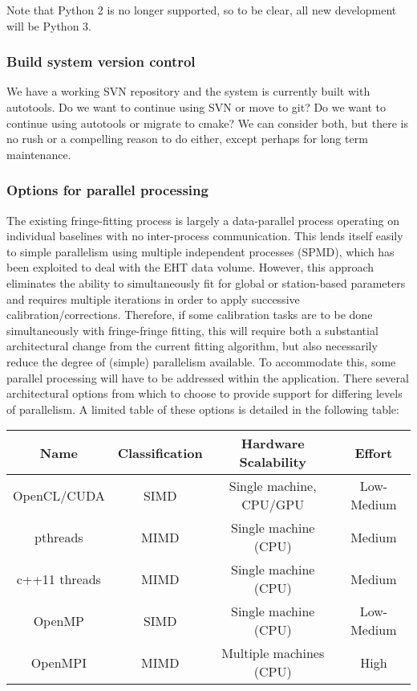 Note that Python 2 is no longer supported, so to be clear, all new
development will be Python 3.

\subsubsection{Build system version control}
\label{sec:software-build}
We have a working SVN repository and the system is currently
built with autotools.
Do we want to continue using SVN or move to git?
Do we want to continue using autotools or migrate to cmake?
We can consider both, but there is no rush or a compelling
reason to do either, except perhaps for long term maintenance.

\subsubsection{Options for parallel processing}
\label{sec:software-parallel}

The existing fringe-fitting process is largely a data-parallel
process operating on individual baselines with no inter-process
communication. This lends itself easily to simple parallelism using
multiple independent processes (SPMD), which has been exploited
\cite{blackburn2019eht} to deal with the EHT data volume. However, this approach
eliminates the ability to simultaneously fit for global or station-based
parameters and requires multiple iterations in order to apply successive
calibration/corrections. Therefore, if some calibration tasks are to be
done simultaneously with fringe-fringe fitting, this will require both a
substantial architectural change from the current fitting algorithm, but
also necessarily reduce the degree of (simple) parallelism available. To
accommodate this, some parallel processing will have to be addressed
within the application. There several architectural options from which
to choose to provide support for differing levels of parallelism. A
limited table of these options is detailed in the following table:

\small
\begin{tabular}{|c|c|c|c|}
\hline
Name & Classification & Hardware Scalability & Effort \\ \hline
OpenCL/CUDA & SIMD & Single machine, CPU/GPU & Low-Medium \\ \hline
pthreads & MIMD & Single machine (CPU) & Medium \\ \hline
c++11 threads & MIMD & Single machine (CPU) & Medium \\ \hline
OpenMP & SIMD & Single machine (CPU) & Low-Medium \\ \hline
OpenMPI & MIMD & Multiple machines (CPU) & High \\ \hline
\end{tabular}
\normalsize

